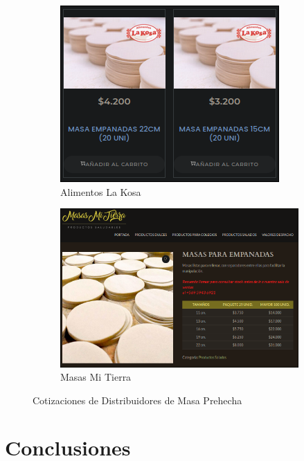 \documentclass[12pt]{article}
\begin{document}
\begin{figure}[h]
\begin{subfigure}{0.28\textwidth}
    \end{subfigure}
    \begin{subfigure}{0.28\textwidth}
        \centering
        \includegraphics[width=0.95\linewidth]{kosa} %
        \caption{Alimentos La Kosa}
        \label{fig:kosa}
    \end{subfigure}
    \begin{subfigure}{0.28\textwidth}
        \centering
        \includegraphics[width=0.95\linewidth]{mitierra} %
        \caption{Masas Mi Tierra}
        \label{fig:tierra}
    \end{subfigure}
    \caption{Cotizaciones de Distribuidores de Masa Prehecha}
    \label{fig:cotizaciones_masas}
\end{figure}




\newpage



\section{Conclusiones} %
\end{document}
